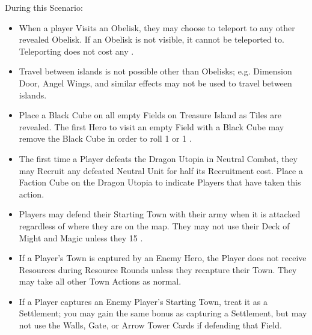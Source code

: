 \begin{multicols*}{2}
During this Scenario:

\begin{itemize}
  \item When a player Visits an Obelisk, they may choose to teleport to any other revealed Obelisk. If an Obelisk is not visible, it cannot be teleported to. Teleporting does not cost any .
  \item Travel between islands is not possible other than Obelisks; e.g. Dimension Door, Angel Wings, and similar effects may not be used to travel between islands.
  \item Place a Black Cube on all empty Fields on Treasure Island as Tiles are revealed. The first Hero to visit an empty Field with a Black Cube may remove the Black Cube in order to roll 1  or 1 .
  \item The first time a Player defeats the Dragon Utopia in Neutral Combat, they may Recruit any defeated Neutral Unit for half its Recruitment cost. Place a Faction Cube on the Dragon Utopia to indicate Players that have taken this action.
  \item Players may defend their Starting Town with their army when it is attacked regardless of where they are on the map. They may not use their Deck of Might and Magic unless they  15 .
  \item If a Player's Town is captured by an Enemy Hero, the Player does not receive Resources during Resource Rounds unless they recapture their Town. They may take all other Town Actions as normal.
  \item If a Player captures an Enemy Player's Starting Town, treat it as a Settlement; you may gain the same bonus as capturing a Settlement, but may not use the Walls, Gate, or Arrow Tower Cards if defending that Field.
\end{itemize}

\vspace*{\fill}

\begin{center}
\end{center}

\vspace*{\fill}

\end{multicols*}

